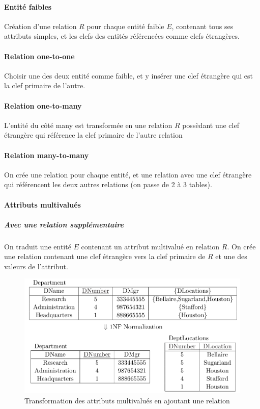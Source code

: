 \documentclass[a4paper]{article}
\begin{document}
\paragraph{Entité faibles}
Création d'une relation $R$ pour chaque entité faible $E$, contenant tous ses
attributs simples, et les clefs des entités référencées comme clefs étrangères.

\paragraph{Relation one-to-one}
Choisir une des deux entité comme faible, et y insérer une clef étrangère qui
est la clef primaire de l'autre.

\paragraph{Relation one-to-many}
L'entité du côté many est transformée en une relation $R$ possèdant une clef étrangère
qui référence la clef primaire de l'autre relation

\paragraph{Relation many-to-many}
On crée une relation pour chaque entité, et une relation avec une clef étrangère
qui référencent les deux autres relations (on passe de 2 à 3 tables).

\paragraph{Attributs multivalués}
\subparagraph{Avec une relation supplémentaire}
On traduit une entité $E$ contenant un attribut multivalué en relation $R$.
On crée une relation contenant une clef étrangère vers la clef primaire de $R$ et
une des valeurs de l'attribut.
\begin{figure}[H]
    \center
    \includegraphics[width=.7\textwidth]{fig/multiattrs-1nf.png}
    \caption{Transformation des attributs multivalués en ajoutant une relation}
\end{figure}
\end{document}
